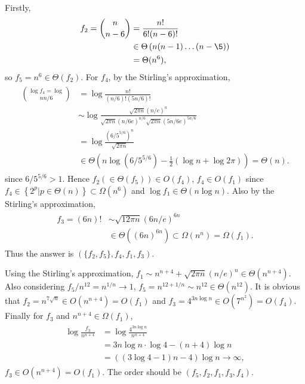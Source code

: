 \documentclass[12pt,twoside]{article}
\begin{document}
\begin{problems}
\begin{problemparts}
  \problempart %
  Firstly,
  \begin{align}
    \begin{split}
      f_2 = \choose{n}{n-6} &= \frac{n!}{6!(n-6)!} \\
                            &\in \Theta\left(n(n-1)\dots (n-\5)\right) \\
                            &= \Theta(n^6),
    \end{split}
  \end{align}
  so $f_5 = n^6 \in\Theta(f_2)$. For $f_4$, by the Stirling's approximation,
  \begin{align}
    \begin{split}
      \log f_4 = \log\choose{n}{n/6} &= \log\frac{n!}{(n/6)!(5n/6)!} \\
                                     &\sim\log\frac{\sqrt{2\pi n}(n/e)^n}{\sqrt{2\pi n}(n/6e)^{n/6}\sqrt{2\pi n}(5n/6e)^{5n/6}} \\
                                     &= \log\frac{(6/5^{5/6})^n}{\sqrt{2\pi n}} \\
                                     &\in \Theta\left(n\log(6/5^{5/6}) - \frac{1}{2}(\log n + \log 2\pi)\right) = \Theta(n).
    \end{split}
  \end{align}
  since $6/5^{5/6} > 1$. Hence $f_2 (\in \Theta(f_5)) \in O(f_4)$,
  $f_4 \in O(f_1)$ since
  $f_4 \in\left\{2^p|p\in\Theta(n)\right\}\subset\Omega(n^6)$ and
  $\log f_1 \in \Theta(n\log n)$.  Also by the Stirling's
  approximation,
  \begin{align}
    \begin{split}
    f_3 = (6n)! &\sim \sqrt{12\pi n}(6n/e)^{6n} \\
                &\in \Theta((6n)^{6n}) \subset\Omega(n^n) = \Omega(f_1).
    \end{split}
  \end{align}
  Thus the answer is $(\{f_2, f_5\}, f_4, f_1, f_3)$.

  \problempart %
  Using the Stirling's approximation,
  $f_1 \sim n^{n+4} + \sqrt{2\pi n}(n/e)^n \in\Theta(n^{n+4})$.
  Also considering $f_5/n^{12} = n^{1/n}\rightarrow 1$,
  $f_5 = n^{12+1/n}\sim n^{12}\in\Theta(n^{12})$.
  It is obvious that $f_2=n^{7\sqrt{n}}\in O(n^{n+4}) = O(f_1)$ and $f_3 = 4^{3n\log n} \in O(7^{n^2}) = O(f_4)$.
  Finally for $f_3$ and $n^{n+4} \in\Omega(f_1)$,
  \begin{align}
    \begin{split}
      \log\frac{f_3}{n^{n+4}} &= \log\frac{4^{3n\log n}}{n^{n+4}} \\
                              &= 3n\log n \cdot\log 4 - (n+4)\log n \\
                              &= ((3\log 4 - 1)n - 4)\log n \rightarrow\infty,
    \end{split}
  \end{align}
  $f_3 \in O(n^{n+4}) = O(f_1)$. The order should be $(f_5, f_2, f_1, f_3, f_4)$.
  

\end{problemparts}
\end{problems}
\end{document}
